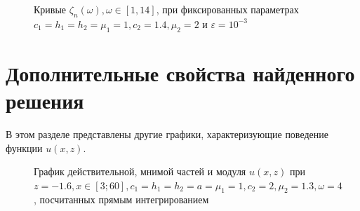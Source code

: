 \documentclass[a4paper, 12pt]{article}
\begin{document}
\begin{figure}[h!]
\noindent{}
\caption{Кривые $\zeta_n(\omega), \omega \in [1,14]$, при фиксированных параметрах $c_1=h_1=h_2=\mu_1=1,c_2=1.4,\mu_2=2$ и $\varepsilon = 10^{-3}$}
\label{figCurves} 
\end{figure}

\section{Дополнительные свойства найденного решения}
В этом разделе представлены другие графики, характеризующие поведение функции $u(x,z)$.

\begin{figure}[h!]
\noindent{}
\caption{График действительной, мнимой частей и модуля $u(x,z)$ при $z=-1.6, x \in [3;60], c_1=h_1=h_2=a=\mu_1=1, c_2=2,\mu_2=1.3,\omega=4$, посчитанных прямым интегрированием}
\label{figCurves}
\end{figure}
\end{document}
